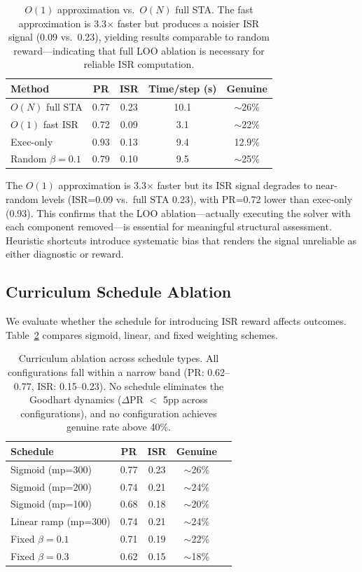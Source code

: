 \documentclass[11pt,a4paper]{article}
\newcommand{\ISR}{\textsc{ISR}}
\newcommand{\STA}{\textsc{STA}}
\begin{document}
\begin{table}[h]
\centering
\small
\begin{tabular}{lcccc}
\toprule
\textbf{Method} & \textbf{PR} & \textbf{\ISR{}} & \textbf{Time/step (s)} & \textbf{Genuine} \\
\midrule
$O(N)$ full \STA{} & 0.77 & 0.23 & 10.1 & $\sim$26\% \\
$O(1)$ fast ISR & 0.72 & 0.09 & 3.1 & $\sim$22\% \\
Exec-only & 0.93 & 0.13 & 9.4 & 12.9\% \\
Random $\beta{=}0.1$ & 0.79 & 0.10 & 9.5 & $\sim$25\% \\
\bottomrule
\end{tabular}
\caption{$O(1)$ approximation vs.\ $O(N)$ full \STA{}. The fast approximation is 3.3$\times$ faster but produces a noisier ISR signal (0.09 vs.\ 0.23), yielding results comparable to random reward---indicating that full LOO ablation is necessary for reliable ISR computation.}
\label{tab:o1_on}
\end{table}

The $O(1)$ approximation is 3.3$\times$ faster but its ISR signal degrades to near-random levels (\ISR{}=0.09 vs.\ full \STA{} 0.23), with PR=0.72 lower than exec-only (0.93). This confirms that the LOO ablation---actually executing the solver with each component removed---is essential for meaningful structural assessment. Heuristic shortcuts introduce systematic bias that renders the signal unreliable as either diagnostic or reward.

\subsection{Curriculum Schedule Ablation}
\label{sec:curriculum}

We evaluate whether the schedule for introducing ISR reward affects outcomes. Table~\ref{tab:curriculum} compares sigmoid, linear, and fixed weighting schemes.

\begin{table}[h]
\centering
\small
\begin{tabular}{lcccc}
\toprule
\textbf{Schedule} & \textbf{PR} & \textbf{\ISR{}} & \textbf{Genuine} \\
\midrule
Sigmoid (mp=300) & 0.77 & 0.23 & $\sim$26\% \\
Sigmoid (mp=200) & 0.74 & 0.21 & $\sim$24\% \\
Sigmoid (mp=100) & 0.68 & 0.18 & $\sim$20\% \\
Linear ramp (mp=300) & 0.74 & 0.21 & $\sim$24\% \\
Fixed $\beta{=}0.1$ & 0.71 & 0.19 & $\sim$22\% \\
Fixed $\beta{=}0.3$ & 0.62 & 0.15 & $\sim$18\% \\
\bottomrule
\end{tabular}
\caption{Curriculum ablation across schedule types. All configurations fall within a narrow band (PR: 0.62--0.77, ISR: 0.15--0.23). No schedule eliminates the Goodhart dynamics ($\Delta$PR $<$ 5pp across configurations), and no configuration achieves genuine rate above 40\%.}
\label{tab:curriculum}
\end{table}
\end{document}
